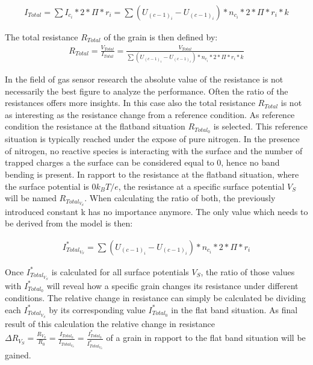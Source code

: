 \documentclass[11pt]{article}
\begin{document}
\begin{align}
I_{Total} = \sum I_{c_i}*2*\Pi*r_i = \sum (U_{(c-1)_{i}}-U_{(c-1)_{i}})* n_{c_i} * 2*\Pi*r_i * k
\end{align}

The total resistance \(R_{Total}\) of the grain is then defined by:
\begin{align}
R_{Total} = \frac{V_{Total}}{I_{Total}} = \frac{V_{Total}}{\sum (U_{(c-1)_{i}}-U_{(c-1)_{i}})* n_{c_i} * 2*\Pi*r_i * k}
\end{align}

In the field of gas sensor research the absolute value of the resistance
is not necessarily the best figure to analyze the performance. Often the
ratio of the resistances offers more insights. In this case also the
total resistance \(R_{Total}\) is not as interesting as the resistance
change from a reference condition. As reference condition the resistance
at the flatband situation \(R_{Total_{0}}\) is selected. This reference
situation is typically reached under the expose of pure nitrogen. In the
presence of nitrogen, no reactive species is interacting with the
surface and the number of trapped charges a the surface can be
considered equal to 0, hence no band bending is present. In rapport to
the resistance at the flatband situation, where the surface potential is
\(0k_BT/e\), the resistance at a specific surface potential \(V_S\) will
be named \(R_{Total_{V_S}}\). When calculating the ratio of both, the
previously introduced constant k has no importance anymore. The only
value which needs to be derived from the model is then:

\begin{align}
    I^*_{Total_{V_S}} = {\sum (U_{(c-1)_{i}}-U_{(c-1)_{i}})* n_{c_i} * 2*\Pi*r_i }
\end{align}

Once \(I^*_{Total_{V_S}}\) is calculated for all surface potentials
\(V_S\), the ratio of those values with \(I^*_{Total_{0}}\) will reveal
how a specific grain changes its resistance under different conditions.
The relative change in resistance can simply be calculated be dividing
each \(I^*_{Total_{V_S}}\) by its corresponding value
\(I^*_{Total_{0}}\) in the flat band situation. As final result of this
calculation the relative change in resistance
\(\Delta R_{V_S} = \frac{R_{V_S}}{R_{0}} = \frac{I_{Total_0}}{I_{Total_{V_S}}}= \frac{I^*_{Total_0}}{I^*_{Total_{V_S}}}\)
of a grain in rapport to the flat band situation will be gained.
\end{document}
